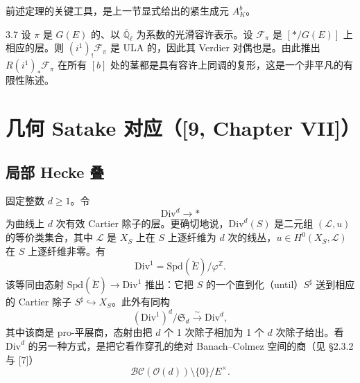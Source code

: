 前述定理的关键工具，是上一节显式给出的紧生成元 $A^b_K$。
\begin{exam}{3.7}
设 $\pi$ 是 $G(E)$ 的、以 $\overline{\mathbb Q}_\ell$ 为系数的光滑容许表示。设 $\mathcal F_\pi$ 是 $[*/G(E)]$ 上相应的层。则 $(i^1)_!\mathcal F_\pi$ 是 ULA 的，因此其 Verdier 对偶也是。由此推出 $R(i^1)_*\mathcal F_\pi$ 在所有 $[b]$ 处的茎都是具有容许上同调的复形，这是一个非平凡的有限性陈述。\label{exam:a3-3-7}
\end{exam}

\section{几何 Satake 对应（[9, Chapter VII]）}

\subsection{局部 Hecke 叠}

固定整数 $d\ge1$。令
\[
\mathrm{Div}^d\longrightarrow *
\]
为曲线上 $d$ 次有效 Cartier 除子的层。更确切地说，$\mathrm{Div}^d(S)$ 是二元组 $(\mathcal L,u)$ 的等价类集合，其中 $\mathcal L$ 是 $X_S$ 上在 $S$ 上逐纤维为 $d$ 次的线丛，$u\in H^0(X_S,\mathcal L)$ 在 $S$ 上逐纤维非零。有
\[
\mathrm{Div}^1=\mathrm{Spd}(\breve E)/\varphi^{\mathbb Z}.
\]
该等同由态射 $\mathrm{Spd}(\breve E)\to\mathrm{Div}^1$ 推出：它把 $S$ 的一个直到化（until）$S^\sharp$ 送到相应的 Cartier 除子 $S^\sharp\hookrightarrow X_S$。此外有同构
\[
(\mathrm{Div}^1)^d/\mathfrak S_d\xrightarrow{\ \sim\ }\mathrm{Div}^d,
\]
其中该商是 pro-平展商，态射由把 $d$ 个 1 次除子相加为 1 个 $d$ 次除子给出。看 $\mathrm{Div}^d$ 的另一种方式，是把它看作穿孔的绝对 Banach--Colmez 空间的商（见 §2.3.2 与 [7]）
\[
\mathcal{BC}(\mathcal O(d))\setminus\{0\}/E^\times.
\]

